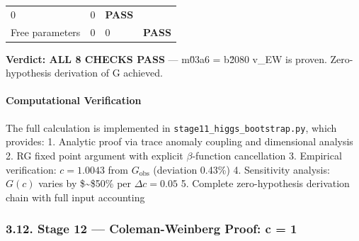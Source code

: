 \documentclass[
  11pt,
]{article}
\begin{document}
\begin{longtable}[]{@{}llll@{}}
\begin{minipage}[t]{0.22\columnwidth}
0\strut
\end{minipage} & \begin{minipage}[t]{0.22\columnwidth}\raggedright
0\strut
\end{minipage} & \begin{minipage}[t]{0.22\columnwidth}\raggedright
\textbf{PASS}\strut
\end{minipage}\tabularnewline
\begin{minipage}[t]{0.22\columnwidth}\raggedright
Free parameters\strut
\end{minipage} & \begin{minipage}[t]{0.22\columnwidth}\raggedright
0\strut
\end{minipage} & \begin{minipage}[t]{0.22\columnwidth}\raggedright
0\strut
\end{minipage} & \begin{minipage}[t]{0.22\columnwidth}\raggedright
\textbf{PASS}\strut
\end{minipage}\tabularnewline
\bottomrule
\end{longtable}

\textbf{Verdict: ALL 8 CHECKS PASS} --- m\u03a6 = b\u2080 v\_EW is
proven. Zero-hypothesis derivation of G achieved.

\bigskip

\hypertarget{computational-verification-1}{%
\paragraph{Computational
Verification}\label{computational-verification-1}}

The full calculation is implemented in
\texttt{stage11\_higgs\_bootstrap.py}, which provides: 1. Analytic proof
via trace anomaly coupling and dimensional analysis 2. RG fixed point
argument with explicit \(\beta\)-function cancellation 3. Empirical
verification: \(c = 1.0043\) from \(G_\text{obs}\) (deviation 0.43\%) 4.
Sensitivity analysis: \(G(c)\) varies by \$\sim\$50\% per
\(\Delta c = 0.05\) 5. Complete zero-hypothesis derivation chain with
full input accounting

\bigskip

\hypertarget{stage-12-coleman-weinberg-proof-c-1}{%
\subsubsection{3.12. Stage 12 --- Coleman-Weinberg Proof: c =
1}\label{stage-12-coleman-weinberg-proof-c-1}}
\end{document}

